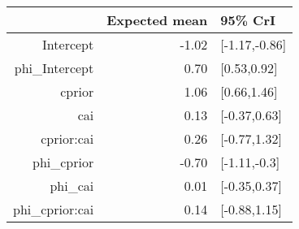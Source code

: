 \begin{tabular}{rrl}
  \hline
 & Expected mean & 95\% CrI \\ 
  \hline
Intercept & -1.02 & [-1.17,-0.86] \\ 
  phi\_Intercept & 0.70 & [0.53,0.92] \\ 
  cprior & 1.06 & [0.66,1.46] \\ 
  cai & 0.13 & [-0.37,0.63] \\ 
  cprior:cai & 0.26 & [-0.77,1.32] \\ 
  phi\_cprior & -0.70 & [-1.11,-0.3] \\ 
  phi\_cai & 0.01 & [-0.35,0.37] \\ 
  phi\_cprior:cai & 0.14 & [-0.88,1.15] \\ 
   \hline
\end{tabular}

